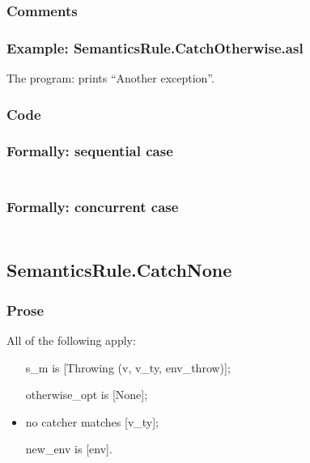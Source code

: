 \documentclass{book}
\begin{document}
    \subsubsection{Comments}

    \subsubsection{Example: SemanticsRule.CatchOtherwise.asl}
     The program:
     prints ``Another exception''.

  \subsubsection{Code}

  \subsubsection{Formally: sequential case}
  \begin{align}
  \end{align} 

  \subsubsection{Formally: concurrent case}
  \begin{align}
  \end{align} 

\subsection{SemanticsRule.CatchNone \label{sec:SemanticsRule.CatchNone}}

    \subsubsection{Prose}
    All of the following apply:
    \begin{itemize}
    \item [s\_m] is [Throwing (v, v\_ty, env\_throw)];
    \item [otherwise\_opt] is [None];
    \item no catcher matches [v\_ty];
    \item [new\_env] is [env].
    \end{itemize}
\end{document}
